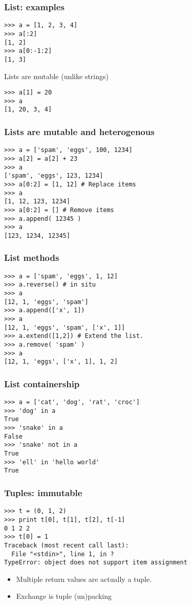 \documentclass[14pt,compress]{beamer}
\newcounter{time}
\newcommand{\inctime}[1]{\addtocounter{time}{#1}{\tiny \thetime\ m}}
\begin{document}
\begin{frame}[fragile]
  \frametitle{List: examples}
\begin{lstlisting}
>>> a = [1, 2, 3, 4]
>>> a[:2]
[1, 2]
>>> a[0:-1:2]
[1, 3]
\end{lstlisting}
\pause
\alert{Lists are mutable (unlike strings)}
\begin{lstlisting}
>>> a[1] = 20
>>> a
[1, 20, 3, 4]
\end{lstlisting}
\end{frame}

\begin{frame}[fragile]
  \frametitle{Lists are mutable and heterogenous}
\begin{lstlisting}
>>> a = ['spam', 'eggs', 100, 1234]
>>> a[2] = a[2] + 23
>>> a
['spam', 'eggs', 123, 1234]
>>> a[0:2] = [1, 12] # Replace items
>>> a
[1, 12, 123, 1234]
>>> a[0:2] = [] # Remove items
>>> a.append( 12345 )
>>> a
[123, 1234, 12345]
\end{lstlisting}
\inctime{10}
\end{frame}


\begin{frame}[fragile]
  \frametitle{List methods}
\begin{lstlisting}
>>> a = ['spam', 'eggs', 1, 12]
>>> a.reverse() # in situ
>>> a
[12, 1, 'eggs', 'spam']
>>> a.append(['x', 1])
>>> a
[12, 1, 'eggs', 'spam', ['x', 1]]
>>> a.extend([1,2]) # Extend the list.
>>> a.remove( 'spam' )
>>> a
[12, 1, 'eggs', ['x', 1], 1, 2]
\end{lstlisting}
\end{frame}

\begin{frame}[fragile]
  \frametitle{List containership}
  \begin{lstlisting}
>>> a = ['cat', 'dog', 'rat', 'croc']
>>> 'dog' in a
True
>>> 'snake' in a
False
>>> 'snake' not in a
True
>>> 'ell' in 'hello world'
True
  \end{lstlisting}
  \inctime{5}
\end{frame}


\begin{frame}[fragile]
  \frametitle{Tuples: immutable}
\begin{lstlisting}
>>> t = (0, 1, 2)
>>> print t[0], t[1], t[2], t[-1] 
0 1 2 2
>>> t[0] = 1
Traceback (most recent call last):
  File "<stdin>", line 1, in ?
TypeError: object does not support item assignment
\end{lstlisting}  
\begin{itemize}
    \item Multiple return values are actually a tuple.
    \item Exchange is tuple (un)packing
\end{itemize}
\inctime{5}
\end{frame}
\end{document}
